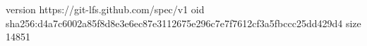 version https://git-lfs.github.com/spec/v1
oid sha256:d4a7c6002a85f8d8e3e6ec87e3112675e296c7e7f7612cf3a5fbccc25dd429d4
size 14851
